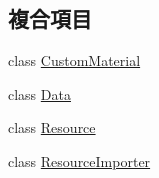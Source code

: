 \subsection*{複合項目}
\begin{DoxyCompactItemize}
\item 
class \hyperlink{class_magnum_1_1_b_v_h_triangle_mesh_shape3_1_1_custom_material}{Custom\+Material}
\item 
class \hyperlink{class_magnum_1_1_b_v_h_triangle_mesh_shape3_1_1_data}{Data}
\item 
class \hyperlink{class_magnum_1_1_b_v_h_triangle_mesh_shape3_1_1_resource}{Resource}
\item 
class \hyperlink{class_magnum_1_1_b_v_h_triangle_mesh_shape3_1_1_resource_importer}{Resource\+Importer}
\end{DoxyCompactItemize}
